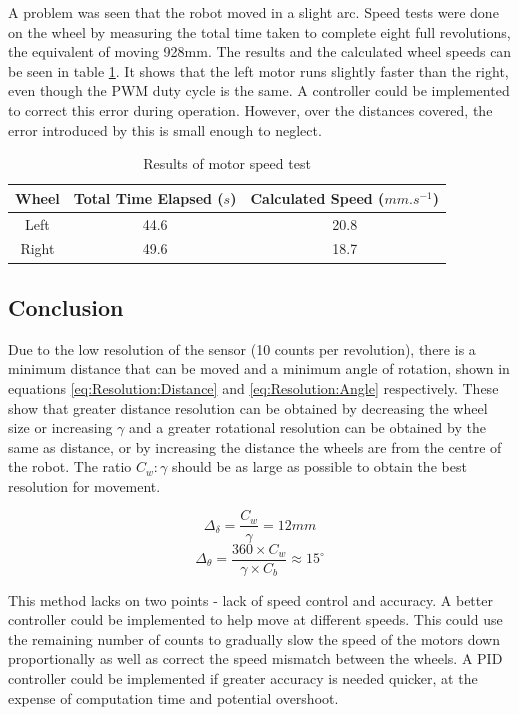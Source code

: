 A problem was seen that the robot moved in a slight arc. Speed tests were done on the wheel by measuring the total time taken to complete eight full revolutions, the equivalent of moving 928mm. The results and the calculated wheel speeds can be seen in table \ref{table:results:motor:speed}. It shows that the left motor runs slightly faster than the right, even though the PWM duty cycle is the same. A controller could be implemented to correct this error during operation. However, over the distances covered, the error introduced by this is small enough to neglect. 

\begin{table}
\caption{Results of motor speed test}
\label{table:results:motor:speed}
\centering
\begin{tabular}{|c|c|c|} \hline
Wheel &	Total Time Elapsed ($s$) & Calculated Speed ($mm.s^{-1}$) \\ \hline
Left & 44.6		&	20.8 \\ \hline
Right & 49.6	&	18.7 \\ \hline
\end{tabular}
\end{table}

\subsection{Conclusion}
Due to the low resolution of the sensor (10 counts per revolution), there is a minimum distance that can be moved and a minimum angle of rotation, shown in equations \eqref{eq:Resolution:Distance} and \eqref{eq:Resolution:Angle} respectively. These show that greater distance resolution can be obtained by decreasing the wheel size or increasing $\gamma$ and a greater rotational resolution can be obtained by the same as distance, or by increasing the distance the wheels are from the centre of the robot. The ratio $C_w:\gamma$ should be as large as possible to obtain the best resolution for movement.


\begin{equation}\label{eq:Resolution:Distance}
\Delta_{\delta} = \frac{C_w}{\gamma} = 12mm
\end{equation}
\begin{equation}\label{eq:Resolution:Angle}
\Delta_{\theta} = \frac{360 \times C_w}{\gamma \times C_b} \approx 15^\circ 
\end{equation}

This method lacks on two points - lack of speed control and accuracy.
A better controller could be implemented to help move at different speeds. This could use the remaining number of counts to gradually slow the speed of the motors down proportionally as well as correct the speed mismatch between the wheels. A PID controller could be implemented if greater accuracy is needed quicker, at the expense of computation time and potential overshoot. 

